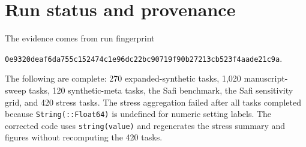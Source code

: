 \documentclass[10pt]{report}
\begin{document}
\section{Run status and provenance}
The evidence comes from run fingerprint
\begin{center}
\texttt{0e9320deaf6da755c152474c1e96dc22bc90719f90b27213cb523f4aade21c9a}.
\end{center}
The following are complete: 270 expanded-synthetic tasks, 1,020 manuscript-sweep tasks, 120 synthetic-meta tasks, the Safi benchmark, the Safi sensitivity grid, and 420 stress tasks. The stress aggregation failed after all tasks completed because \texttt{String(::Float64)} is undefined for numeric setting labels. The corrected code uses \texttt{string(value)} and regenerates the stress summary and figures without recomputing the 420 tasks.
\end{document}
